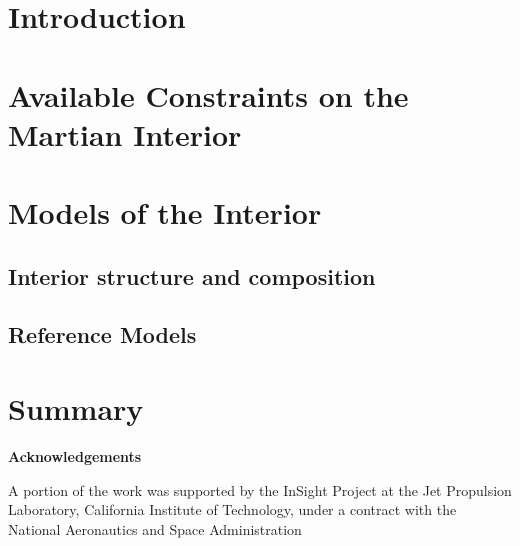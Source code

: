 \documentclass[natbib]{svjour3}
\begin{document}
{}


\newpage
\section{Introduction \label{sec:introduction}}
\newpage
\section{Available Constraints on the Martian Interior \label{sec:constraints}}
\newpage
\section{Models of the Interior \label{sec:models}}
\newpage
\subsection{{Interior structure and composition\label{sec:interior}}}
\newpage
\subsection{Reference Models \label{sec:models}}
\newpage
\section{Summary\label{sec:summary}}

\textbf{Acknowledgements}
 
A portion of the work was supported by the InSight Project at the Jet Propulsion Laboratory, California Institute of Technology, under a contract with the National Aeronautics and Space Administration



\end{document}
